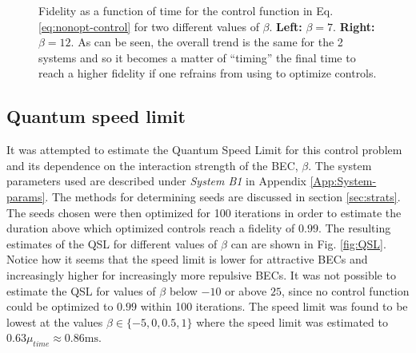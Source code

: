\documentclass[a4paper, twocolumn]{revtex4-1}
\begin{document}
\begin{figure}
\begin{subfigure}{0.45\columnwidth}
	\end{subfigure}
	\caption{Fidelity as a function of time for the control function in Eq. \eqref{eq:nonopt-control} for two different values of $\beta$. \textbf{Left:} $\beta=7$. \textbf{Right:} $\beta=12$. As can be seen, the overall trend is the same for the 2 systems and so it becomes a matter of ``timing'' the final time to reach a higher fidelity if one refrains from using  to optimize controls.}
	\label{fig:fidelityplot}
\end{figure}

\subsection{Quantum speed limit}
It was attempted to estimate the Quantum Speed Limit for this control problem and its dependence on the interaction strength of the BEC, $\beta$. The system parameters used are described under \textit{System B1} in Appendix \ref{App:System-params}. The methods for determining seeds are discussed in section \ref{sec:strats}. The seeds chosen were then optimized for 100 iterations in order to estimate the duration above which optimized controls reach a fidelity of $0.99$. The resulting estimates of the QSL for different values of $\beta$ can are shown in Fig. \ref{fig:QSL}. Notice how it seems that the speed limit is lower for attractive BECs and increasingly higher for increasingly more repulsive BECs. It was not possible to estimate the QSL for values of $\beta$ below $-10$ or above $25$, since no control function could be optimized to $0.99$ within 100 iterations. The speed limit was found to be lowest at the values $\beta\in\{-5,0,0.5,1\}$ where the speed limit was estimated to $0.63\mu_{time} \approx 0.86\text{ms}$.\\
\end{document}

